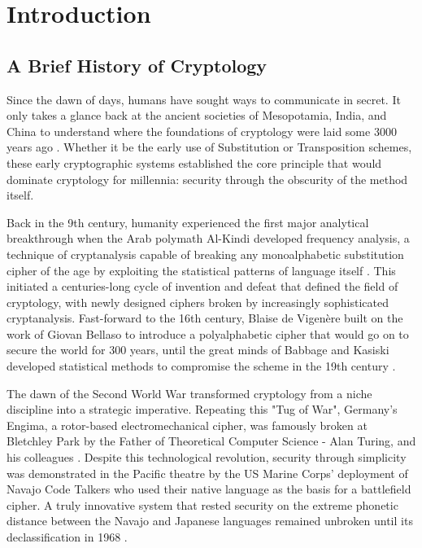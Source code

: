 \documentclass[10pt, a4paper]{report}
\begin{document}
\clearpage
{}

\chapter{Introduction}

\section{A Brief History of Cryptology}


Since the dawn of days, humans have sought ways to communicate in secret. It only takes a glance back at the ancient societies of Mesopotamia, India, and China to understand where the foundations of cryptology were laid some 3000 years ago \cite{Kahn1967Code}. Whether it be the early use of Substitution or Transposition schemes, these early cryptographic systems established the core principle that would dominate cryptology for millennia: security through the obscurity of the method itself. 

Back in the 9th century, humanity experienced the first major analytical breakthrough when the Arab polymath Al-Kindi developed frequency analysis, a technique of cryptanalysis capable of breaking any monoalphabetic substitution cipher of the age by exploiting the statistical patterns of language itself \cite{AlKadi1992}. This initiated a centuries-long cycle of invention and defeat that defined the field of cryptology, with newly designed ciphers broken by increasingly sophisticated cryptanalysis. Fast-forward to the 16th century, Blaise de Vigen\`ere built on the work of Giovan Bellaso to introduce a polyalphabetic cipher that would go on to secure the world for 300 years, until the great minds of Babbage and Kasiski developed statistical methods to compromise the scheme in the 19th century \cite{Singh1999, Bauer2021}.

The dawn of the Second World War transformed cryptology from a niche discipline into a strategic imperative. Repeating this "Tug of War", Germany's Engima, a rotor-based electromechanical cipher, was famously broken at Bletchley Park by the Father of Theoretical Computer Science - Alan Turing, and his colleagues \cite{Hodges2014}. Despite this technological revolution, security through simplicity was demonstrated in the Pacific theatre by the US Marine Corps' deployment of Navajo Code Talkers who used their native language as the basis for a battlefield cipher. A truly innovative system that rested security on the extreme phonetic distance between the Navajo and Japanese languages remained unbroken until its declassification in 1968 \cite{Huffman2000}. 
\end{document}
